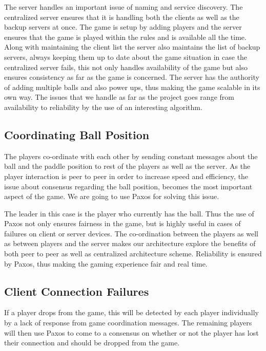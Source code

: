 \documentclass{sig-alternate}
\begin{document}
The server handles an important issue of naming and service discovery.  The
centralized server ensures  that it is handling both the clients as well as
the backup servers at once. The game is setup by adding players and the
server ensures  that the game is played within the rules and is available
all the time. Along with maintaining the client list the server also
maintains the list of backup servers, always keeping them up to date about
the game situation in case the centralized server fails, this not only
handles availability of the game but also ensures consistency as far as the
game is concerned. The server has the authority of adding multiple balls
and also power ups, thus making the game scalable in its own way. The
issues that we handle as far as the project goes range from availability to
reliability by the use of an interesting algorithm.

\subsection{Coordinating Ball Position}

The players co-ordinate with each other by sending constant messages about
the ball and the paddle position to rest of the players as well as the
server. As the player interaction is peer to peer in order to increase
speed and efficiency, the issue about consensus regarding the ball
position, becomes the most important aspect of the game. We are going to
use Paxos\cite{lamport:paxos} for solving this issue.

The leader in this case is the player who currently has the ball. Thus the
use of Paxos not only ensures fairness in the game, but is highly useful in
cases of failures on client or server devices. The co-ordination between
the players as well as between players and the server makes our
architecture explore the benefits of both peer to peer as well as
centralized architecture scheme.  Reliability is ensured by Paxos, thus
making the gaming experience fair and real time.

\subsection{Client Connection Failures}

If a player drops from the game, this will be detected by each player
individually by a lack of response from game coordination messages. The
remaining players will then use Paxos to come to a consensus on whether or
not the player has lost their connection and should be dropped from the
game.
\end{document}
